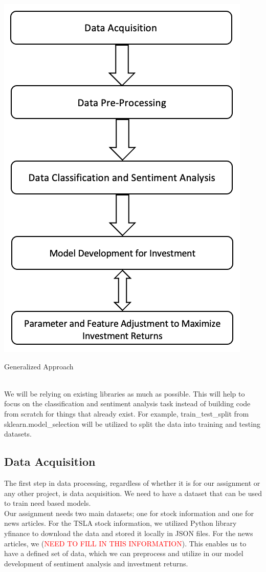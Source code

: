\documentclass[twocolumn,10pt]{article}
\makeatletter
\newenvironment{figurehere}
  {\def\@captype{figure}}
  {}
\makeatother
\begin{document}
\begin{multicols}{2}
\begin{flushleft}
	\begin{figurehere}
		\centering
		\includegraphics[width=0.65\linewidth]{images/gen_approach.png}
		\caption{Generalized Approach}
		\label{fig:gen_approach}
	\end{figurehere}
	
	\mbox{}\\
	We will be relying on existing libraries as much as possible. This will help to focus on the classification and sentiment analysis task instead of building code from scratch for things that already exist. For example, train\_test\_split from sklearn.model\_selection \cite{scdatasplit} will be utilized to split the data into training and testing datasets.
		
	\subsection{Data Acquisition} \label{data_acquisition}
	The first step in data processing, regardless of whether it is for our assignment or any other project, is data acquisition. We need to have a dataset that can be used to train need based models.\\
	Our assignment needs two main datasets; one for stock information and one for news articles. For the TSLA stock information, we utilized Python library yfinance \cite{yfin} to download the data and stored it locally in JSON files. For the news articles, we (\textcolor{red}{NEED TO FILL IN THIS INFORMATION}). This enables us to have a defined set of data, which we can preprocess and utilize in our model development of sentiment analysis and investment returns.\\
	

\end{flushleft}
\end{multicols}
\end{document}
